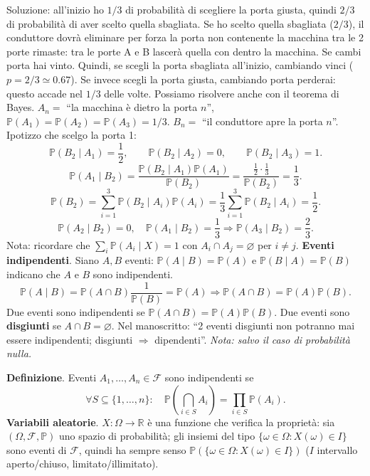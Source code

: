 \documentclass[11pt,a4paper]{article}
\newcommand{\pagina}[1]{\clearpage}
\begin{document}
Soluzione: all'inizio ho $1/3$ di probabilità di scegliere la porta giusta, quindi $2/3$ di probabilità di aver scelto quella sbagliata. Se ho scelto quella sbagliata ($2/3$), il conduttore dovrà eliminare per forza la porta non contenente la macchina tra le 2 porte rimaste: tra le porte A e B lascerà quella con dentro la macchina. Se cambi porta hai vinto.
\pagina{17}Quindi, se scegli la porta sbagliata all'inizio, cambiando vinci ($p=2/3\simeq0.67$). Se invece scegli la porta giusta, cambiando porta perderai: questo accade nel $1/3$ delle volte.
Possiamo risolvere anche con il teorema di Bayes.
$A_n=$ ``la macchina è dietro la porta $n$'', $\mathbb P(A_1)=\mathbb P(A_2)=\mathbb P(A_3)=1/3$.
$B_n=$ ``il conduttore apre la porta $n$''. Ipotizzo che scelgo la porta 1:
\[\mathbb P(B_2\mid A_1)=\frac12,\qquad\mathbb P(B_2\mid A_2)=0,\qquad\mathbb P(B_2\mid A_3)=1.\]
\[\mathbb P(A_1\mid B_2)=\frac{\mathbb P(B_2\mid A_1)\mathbb P(A_1)}{\mathbb P(B_2)}=\frac{\frac12\cdot\frac13}{\mathbb P(B_2)}=\frac13.\]
\[\mathbb P(B_2)=\sum_{i=1}^3\mathbb P(B_2\mid A_i)\mathbb P(A_i)=\frac13\sum_{i=1}^3\mathbb P(B_2\mid A_i)=\frac12.\]
\[\mathbb P(A_2\mid B_2)=0,\quad\mathbb P(A_1\mid B_2)=\frac13\Rightarrow\mathbb P(A_3\mid B_2)=\frac23.\]
Nota: ricordare che $\sum_i\mathbb P(A_i\mid X)=1$ con $A_i\cap A_j=\varnothing$ per $i\ne j$.
\textbf{Eventi indipendenti}. Siano $A,B$ eventi: $\mathbb P(A\mid B)=\mathbb P(A)$ e $\mathbb P(B\mid A)=\mathbb P(B)$ indicano che $A$ e $B$ sono indipendenti.
\pagina{18}\[\mathbb P(A\mid B)=\mathbb P(A\cap B)\frac1{\mathbb P(B)}=\mathbb P(A)\Rightarrow\boxed{\mathbb P(A\cap B)=\mathbb P(A)\mathbb P(B)}.\]
Due eventi sono indipendenti se $\mathbb P(A\cap B)=\mathbb P(A)\mathbb P(B)$.
Due eventi sono \textbf{disgiunti} se $A\cap B=\varnothing$.
Nel manoscritto: ``2 eventi disgiunti non potranno mai essere indipendenti; disgiunti $\Rightarrow$ dipendenti''. \emph{Nota: salvo il caso di probabilità nulla.}

\textbf{Definizione}. Eventi $A_1,\ldots,A_n\in\mathcal F$ sono indipendenti se
\[\forall S\subseteq\{1,\ldots,n\}:\quad\mathbb P\left(\bigcap_{i\in S}A_i\right)=\prod_{i\in S}\mathbb P(A_i).\]
\textbf{Variabili aleatorie}. $X:\Omega\to\mathbb R$ è una funzione che verifica la proprietà: sia $(\Omega,\mathcal F,\mathbb P)$ uno spazio di probabilità; gli insiemi del tipo $\{\omega\in\Omega:X(\omega)\in I\}$ sono eventi di $\mathcal F$, quindi ha sempre senso $\mathbb P(\{\omega\in\Omega:X(\omega)\in I\})$ ($I$ intervallo aperto/chiuso, limitato/illimitato).
\end{document}
